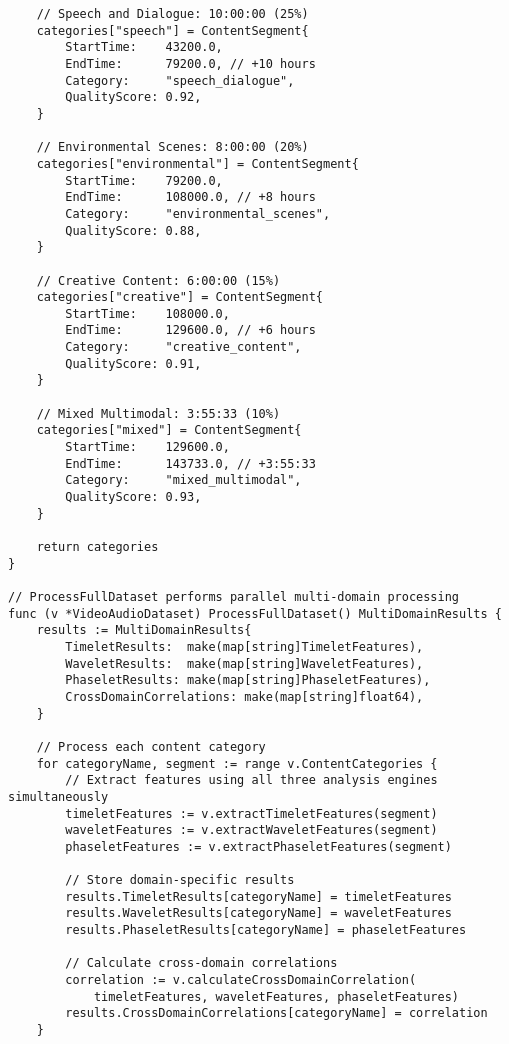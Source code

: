 \begin{tcolorbox}[colback=CodeBackground, colframe=DarkGray, title=Video-Audio Dataset Processing, fonttitle=\bfseries]
\begin{verbatim}
    // Speech and Dialogue: 10:00:00 (25%)
    categories["speech"] = ContentSegment{
        StartTime:    43200.0,
        EndTime:      79200.0, // +10 hours
        Category:     "speech_dialogue",
        QualityScore: 0.92,
    }
    
    // Environmental Scenes: 8:00:00 (20%)
    categories["environmental"] = ContentSegment{
        StartTime:    79200.0,
        EndTime:      108000.0, // +8 hours
        Category:     "environmental_scenes",
        QualityScore: 0.88,
    }
    
    // Creative Content: 6:00:00 (15%)
    categories["creative"] = ContentSegment{
        StartTime:    108000.0,
        EndTime:      129600.0, // +6 hours
        Category:     "creative_content",
        QualityScore: 0.91,
    }
    
    // Mixed Multimodal: 3:55:33 (10%)
    categories["mixed"] = ContentSegment{
        StartTime:    129600.0,
        EndTime:      143733.0, // +3:55:33
        Category:     "mixed_multimodal",
        QualityScore: 0.93,
    }
    
    return categories
}

// ProcessFullDataset performs parallel multi-domain processing
func (v *VideoAudioDataset) ProcessFullDataset() MultiDomainResults {
    results := MultiDomainResults{
        TimeletResults:  make(map[string]TimeletFeatures),
        WaveletResults:  make(map[string]WaveletFeatures),
        PhaseletResults: make(map[string]PhaseletFeatures),
        CrossDomainCorrelations: make(map[string]float64),
    }
    
    // Process each content category
    for categoryName, segment := range v.ContentCategories {
        // Extract features using all three analysis engines simultaneously
        timeletFeatures := v.extractTimeletFeatures(segment)
        waveletFeatures := v.extractWaveletFeatures(segment)
        phaseletFeatures := v.extractPhaseletFeatures(segment)
        
        // Store domain-specific results
        results.TimeletResults[categoryName] = timeletFeatures
        results.WaveletResults[categoryName] = waveletFeatures
        results.PhaseletResults[categoryName] = phaseletFeatures
        
        // Calculate cross-domain correlations
        correlation := v.calculateCrossDomainCorrelation(
            timeletFeatures, waveletFeatures, phaseletFeatures)
        results.CrossDomainCorrelations[categoryName] = correlation
    }
    

\end{verbatim}
\end{tcolorbox}

